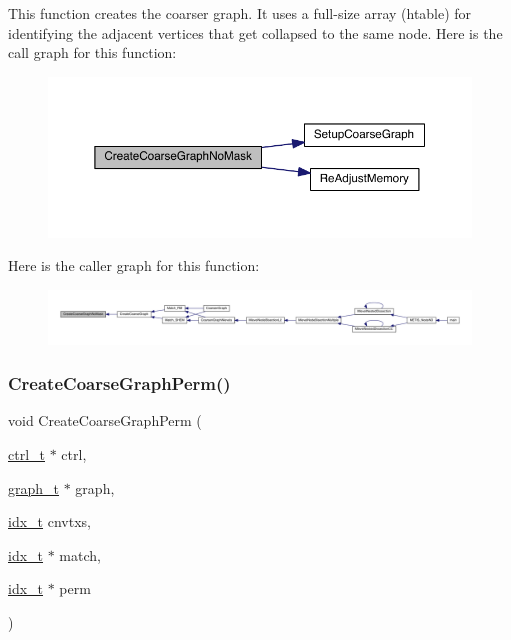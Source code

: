 This function creates the coarser graph. It uses a full-\/size array (htable) for identifying the adjacent vertices that get collapsed to the same node. Here is the call graph for this function\+:\nopagebreak
\begin{figure}[H]
\begin{center}
\leavevmode
\includegraphics[width=350pt]{a00182_a70dc59d4c7190507e7ad9a4cc0d80707_cgraph}
\end{center}
\end{figure}
Here is the caller graph for this function\+:\nopagebreak
\begin{figure}[H]
\begin{center}
\leavevmode
\includegraphics[width=350pt]{a00182_a70dc59d4c7190507e7ad9a4cc0d80707_icgraph}
\end{center}
\end{figure}
\mbox{\label{a00182_a0aba484ba693edd6d56426d04bd7fd4b}} 
\subsubsection{\texorpdfstring{Create\+Coarse\+Graph\+Perm()}{CreateCoarseGraphPerm()}}
{\footnotesize\ttfamily void Create\+Coarse\+Graph\+Perm (\begin{DoxyParamCaption}\item[{\hyperlink{a00742}{ctrl\+\_\+t} $\ast$}]{ctrl,  }\item[{\hyperlink{a00734}{graph\+\_\+t} $\ast$}]{graph,  }\item[{\hyperlink{a00876_aaa5262be3e700770163401acb0150f52}{idx\+\_\+t}}]{cnvtxs,  }\item[{\hyperlink{a00876_aaa5262be3e700770163401acb0150f52}{idx\+\_\+t} $\ast$}]{match,  }\item[{\hyperlink{a00876_aaa5262be3e700770163401acb0150f52}{idx\+\_\+t} $\ast$}]{perm }\end{DoxyParamCaption})}

